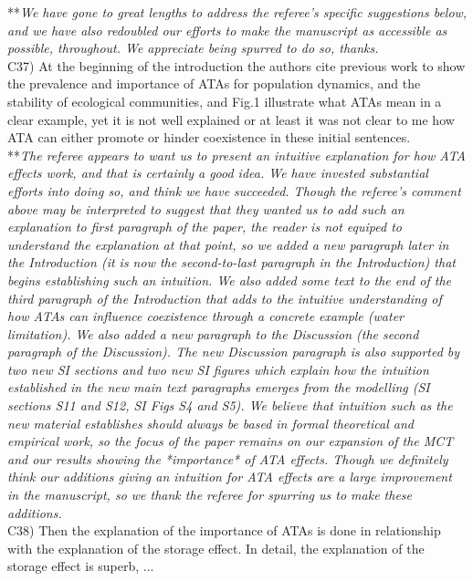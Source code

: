 \documentclass[letterpaper,11pt]{article}
\begin{document}
\noindent ***\emph{We have gone to great lengths to address the referee's specific suggestions below, and we have also redoubled our
efforts to make the manuscript as accessible as possible, throughout. We appreciate being spurred to do so, thanks. } \\

\noindent C37) At the beginning of the introduction the authors cite previous work to show the prevalence and importance of ATAs for population dynamics, and the stability of ecological communities, and Fig.1 illustrate what ATAs mean in a clear example, yet it is not well explained or at least it was not clear to me how ATA can either promote or hinder coexistence in these initial sentences. \\

\noindent ***\emph{The referee appears to want us to present an intuitive explanation for how ATA effects work, and that 
is certainly a good idea. We have invested substantial efforts into doing so, and think we have succeeded. Though the referee's comment above may 
be interpreted to suggest that they wanted us
to add such an explanation to first paragraph of the paper, the reader is not equiped to understand the explanation at that 
point, so we added a new paragraph later in the Introduction (it is now the
second-to-last paragraph in the Introduction) that begins establishing such an intuition. We also added some text to the end of
the third paragraph of the Introduction that adds to the intuitive understanding of how ATAs can influence coexistence through a concrete 
example (water limitation). We also added a new paragraph to the 
Discussion (the second paragraph of the Discussion). The new Discussion 
paragraph is also supported by two new SI sections and two new SI figures which 
explain how the intuition established in the new main text paragraphs emerges from the modelling (SI sections S11 
and S12, SI Figs S4 and S5).
We believe that intuition such as the new material establishes should always be based in formal theoretical and 
empirical work, so the focus of the paper remains on our expansion of the MCT and our results showing
the *importance* of ATA effects. Though we definitely think our additions giving an intuition for ATA effects are a large
improvement in the manuscript, so we thank the referee for spurring us to make these additions.  } \\

\noindent C38) Then the explanation of the importance of ATAs is done in relationship with the explanation of the storage effect. In detail, the explanation of the storage effect is superb, ... \\
\end{document}
